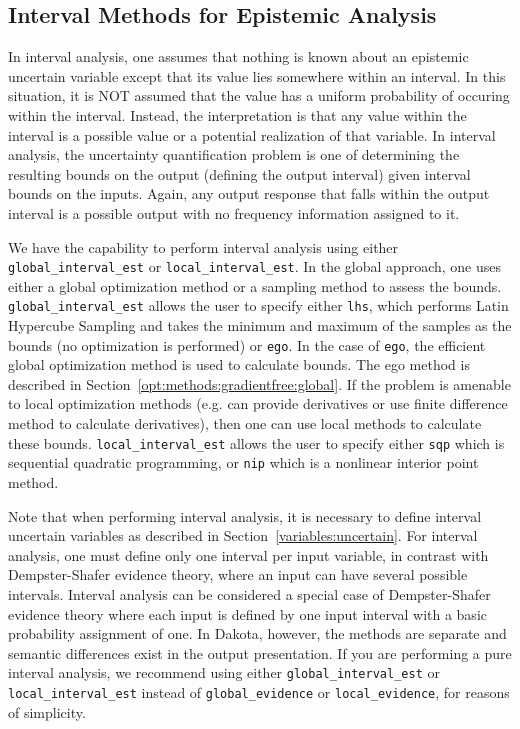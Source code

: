 \subsection{Interval Methods for Epistemic Analysis}\label{uq:interval}

In interval analysis, one assumes that nothing is known about 
an epistemic uncertain variable except that its value lies 
somewhere within an interval. In this situation, it is NOT 
assumed that the value has a uniform probability of occuring 
within the interval. Instead, the interpretation is that 
any value within the interval is a possible value or a potential 
realization of that variable. In interval analysis, the 
uncertainty quantification problem is one of determining the 
resulting bounds on the output (defining the output interval) 
given interval bounds on the inputs. Again, any output response 
that falls within the output interval is a possible output 
with no frequency information assigned to it.

We have the capability to perform interval analysis using either
\texttt{global\_interval\_est} or \texttt{local\_interval\_est}.  In
the global approach, one uses either a global optimization method or a
sampling method to assess the bounds.  \texttt{global\_interval\_est}
allows the user to specify either \texttt{lhs}, which performs Latin
Hypercube Sampling and takes the minimum and maximum of the samples as
the bounds (no optimization is performed) or \texttt{ego}. In the case
of \texttt{ego}, the efficient global optimization method is used to
calculate bounds. The ego method is described in
Section~\ref{opt:methods:gradientfree:global}.  If the problem is
amenable to local optimization methods (e.g. can provide derivatives
or use finite difference method to calculate derivatives), then one
can use local methods to calculate these
bounds. \texttt{local\_interval\_est} allows the user to specify
either \texttt{sqp} which is sequential quadratic programming, or
\texttt{nip} which is a nonlinear interior point method.

Note that when performing interval analysis, it is necessary to define
interval uncertain variables as described in
Section~\ref{variables:uncertain}. For interval analysis, one must
define only one interval per input variable, in contrast with
Dempster-Shafer evidence theory, where an input can have several
possible intervals. Interval analysis can be considered a special
case of Dempster-Shafer evidence theory where each input is defined by
one input interval with a basic probability assignment of one. In
Dakota, however, the methods are separate and semantic differences
exist in the output presentation. If you are performing a pure
interval analysis, we recommend using either
\texttt{global\_interval\_est} or \texttt{local\_interval\_est}
instead of \texttt{global\_evidence} or \texttt{local\_evidence}, for
reasons of simplicity. %


